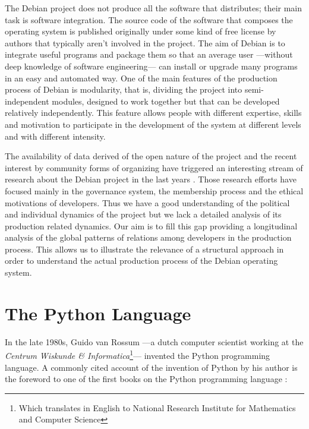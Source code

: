 The Debian project does not produce all the software that distributes; their main task is software integration. The source code of the software that composes the operating system is published originally under some kind of free license by authors that typically aren't involved in the project. The aim of Debian is to integrate useful programs and package them so that an average user ---without deep knowledge of software engineering--- can install or upgrade many programs in an easy and automated way. One of the main features of the production process of Debian is modularity, that is, dividing the project into semi-independent modules, designed to work together but that can be developed relatively independently. This feature allows people with different expertise, skills and motivation to participate in the development of the system at different levels and with different intensity.

The availability of data derived of the open nature of the project and the recent interest by community forms of organizing have triggered an interesting stream of research about the Debian project in the last years \citep{omahony:2003,coleman:2005,omahony:2007,ferraro:2010}. Those research efforts have focused mainly in the governance system, the membership process and the ethical motivations of developers. Thus we have a good understanding of the political and individual dynamics of the project but we lack a detailed analysis of its production related dynamics. Our aim is to fill this gap providing a longitudinal analysis of the global patterns of relations among developers in the production process. This allows us to illustrate the relevance of a structural approach in order to understand the actual production process of the Debian operating system.

\section{The Python Language}

In the late 1980s, Guido van Rossum ---a dutch computer scientist working at the \emph{Centrum Wiskunde \& Informatica}\footnote{Which translates in English to National Research Institute for Mathematics and Computer Science}--- invented the Python programming language. A commonly cited account of the invention of Python by his author is the foreword to one of the first books on the Python programming language \citep{lutz:1996}:

